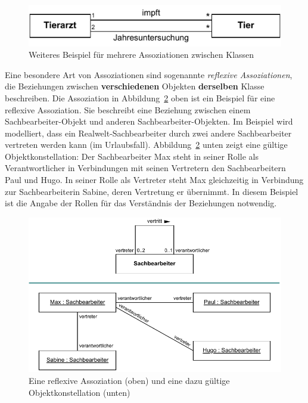 \begin{figure}[h!]
	\centering
	\includegraphics{Bilder/Kapitel-4/tierarzt_tier.pdf}
	\caption[Beispiel für mehrere Assoziationen zwischen Klassen]{Weiteres Beispiel für mehrere Assoziationen zwischen Klassen}
	\label{fig:tierarzt_tier}
\end{figure}


Eine besondere Art von Assoziationen sind sogenannte \textit{reflexive Assoziationen}, die Beziehungen zwischen \textbf{verschiedenen} Objekten \textbf{derselben} Klasse beschreiben. Die Assoziation  in Abbildung~\ref{fig:assoziation_und_objektkonstellation} oben ist ein Beispiel für eine reflexive Assoziation. Sie beschreibt eine Beziehung zwischen einem Sachbearbeiter-Objekt und anderen Sachbearbeiter-Objekten. Im Beispiel wird modelliert, dass ein Realwelt-Sachbearbeiter durch zwei andere Sachbearbeiter vertreten werden kann (\zb im Urlaubsfall). Abbildung~\ref{fig:assoziation_und_objektkonstellation} unten zeigt eine gültige Objektkonstellation: Der Sachbearbeiter Max steht in seiner Rolle als Verantwortlicher in Verbindungen mit seinen Vertretern den Sachbearbeitern Paul und Hugo. In seiner Rolle als Vertreter steht Max gleichzeitig in Verbindung zur Sachbearbeiterin Sabine, deren Vertretung er übernimmt. In diesem Beispiel ist die Angabe der Rollen für das Verständnis der Beziehungen notwendig. 

\begin{figure}[h!]
	\centering
	\includegraphics{Bilder/Kapitel-4/sachbearbeiter.pdf}
	\caption[Eine reflexive Assoziation]{Eine reflexive Assoziation (oben) und eine dazu gültige Objekt\-konstellation (unten)}
	\label{fig:assoziation_und_objektkonstellation}
\end{figure}

